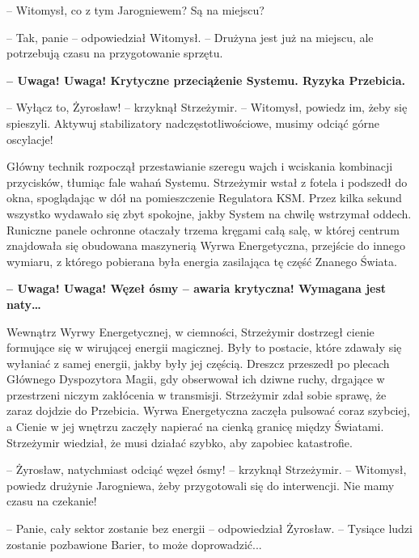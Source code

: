 \par\noindent-- Witomysł, co z tym Jarogniewem? Są na miejscu?
\par\noindent-- Tak, panie -- odpowiedział Witomysł. -- Drużyna jest już na miejscu, ale potrzebują czasu na przygotowanie sprzętu.
\vspace{0.15cm}
\par\noindent\textbf{-- Uwaga! Uwaga! Krytyczne przeciążenie Systemu. Ryzyka Przebicia.}
\vspace{0.15cm}
\par\noindent-- Wyłącz to, Żyrosław! -- krzyknął Strzeżymir. -- Witomysł, powiedz im, żeby się spieszyli. Aktywuj stabilizatory nadczęstotliwościowe, musimy odciąć górne oscylacje!
\par\indent Główny technik rozpoczął przestawianie szeregu wajch i wciskania kombinacji przycisków, tłumiąc fale wahań Systemu. Strzeżymir wstał z fotela i podszedł do okna, spoglądając w dół na pomieszczenie Regulatora KSM. Przez kilka sekund wszystko wydawało się zbyt spokojne, jakby System na chwilę wstrzymał oddech. Runiczne panele ochronne otaczały trzema kręgami całą salę, w której centrum znajdowała się obudowana maszynerią Wyrwa Energetyczna, przejście do innego wymiaru, z którego pobierana była energia zasilająca tę część Znanego Świata. 
\vspace{0.15cm}
\par\noindent\textbf{-- Uwaga! Uwaga! Węzeł ósmy -- awaria krytyczna! Wymagana jest naty\dots}
\vspace{0.15cm}
\par\indent Wewnątrz Wyrwy Energetycznej, w ciemności, Strzeżymir dostrzegł cienie formujące się w wirującej energii magicznej. Były to postacie, które zdawały się wyłaniać z samej energii, jakby były jej częścią. Dreszcz przeszedł po plecach Głównego Dyspozytora Magii, gdy obserwował ich dziwne ruchy, drgające w przestrzeni niczym zakłócenia w transmisji. Strzeżymir zdał sobie sprawę, że zaraz dojdzie do Przebicia. Wyrwa Energetyczna zaczęła pulsować coraz szybciej, a Cienie w jej wnętrzu zaczęły napierać na cienką granicę między Światami. Strzeżymir wiedział, że musi działać szybko, aby zapobiec katastrofie.
\par\noindent-- Żyrosław, natychmiast odciąć węzeł ósmy! -- krzyknął Strzeżymir. -- Witomysł, powiedz drużynie Jarogniewa, żeby przygotowali się do interwencji. Nie mamy czasu na czekanie!
\par\noindent-- Panie, cały sektor zostanie bez energii -- odpowiedział Żyrosław. -- Tysiące ludzi zostanie pozbawione Barier, to może doprowadzić... 
